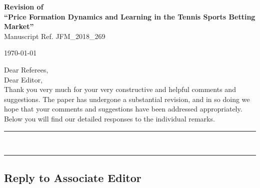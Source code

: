 \documentclass[letterpaper,12pt]{article}
\newcounter{b}
\begin{document}
\itemsep6pt

\onehalfspacing

\begin{center}
\textbf{\Large Revision of \\[6pt]
``Price Formation Dynamics and Learning in the Tennis
Sports Betting Market''}\\[6pt]
Manuscript Ref. JFM\_2018\_269\\[24pt]
\end{center}


\begin{flushright}
   \today
\end{flushright}

Dear Referees,\\
Dear Editor,\\

Thank you very much for your very constructive and helpful comments and suggestions. The paper has undergone a substantial revision, and in so doing we hope that your comments and suggestions have been addressed appropriately. Below you will find our detailed responses to the individual remarks.

\bigskip
\noindent\textcolor{ourcol}{\rule{\linewidth}{1pt}}\\[2pt]

\noindent\textcolor{ourcol}{\rule{\linewidth}{0.4pt}}


\newpage


\subsection*{Reply to Associate Editor}
\end{document}
